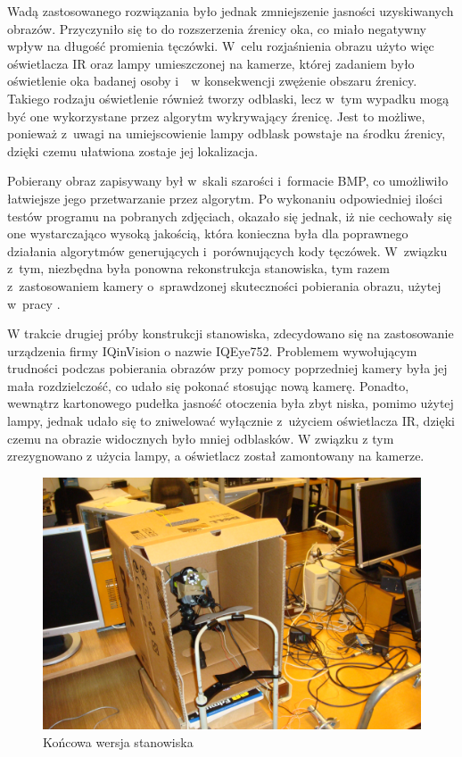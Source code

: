 Wadą zastosowanego rozwiązania było jednak zmniejszenie jasności uzyskiwanych obrazów. Przyczyniło się to do rozszerzenia źrenicy oka, co miało negatywny wpływ na długość promienia tęczówki. W~celu rozjaśnienia obrazu użyto więc oświetlacza IR oraz lampy umieszczonej na kamerze, której zadaniem było oświetlenie oka badanej osoby i~~w konsekwencji zwężenie obszaru źrenicy. Takiego rodzaju oświetlenie również tworzy odblaski, lecz w~tym wypadku mogą być one wykorzystane przez algorytm wykrywający źrenicę. Jest to możliwe, ponieważ z~uwagi na umiejscowienie lampy odblask powstaje na środku źrenicy, dzięki czemu ułatwiona zostaje jej lokalizacja.

Pobierany obraz zapisywany był w~skali szarości i~formacie BMP, co umożliwiło łatwiejsze jego przetwarzanie przez algorytm. Po wykonaniu odpowiedniej ilości testów programu na pobranych zdjęciach, okazało się jednak, iż nie cechowały się one wystarczająco wysoką jakością, która konieczna była dla poprawnego działania algorytmów generujących i~porównujących kody tęczówek. W~związku z~tym, niezbędna była ponowna rekonstrukcja stanowiska, tym razem z~zastosowaniem kamery o~sprawdzonej skuteczności pobierania obrazu, użytej w~pracy \cite{Gl11}.

W trakcie drugiej próby konstrukcji stanowiska, zdecydowano się na zastosowanie urządzenia firmy IQinVision o nazwie IQEye752. Problemem wywołującym trudności podczas pobierania obrazów przy pomocy poprzedniej kamery była jej mała rozdzielczość, co udało się pokonać stosując nową kamerę. Ponadto, wewnątrz kartonowego pudełka jasność otoczenia była zbyt niska, pomimo użytej lampy, jednak udało się to zniwelować wyłącznie z~użyciem oświetlacza IR, dzięki czemu na obrazie widocznych było mniej odblasków. W związku z tym zrezygnowano z użycia lampy, a oświetlacz został zamontowany na kamerze.

\begin{figure}[h!]
\begin{center}
\includegraphics[scale=0.1]{stanowisko1.jpg}
\caption{Końcowa wersja stanowiska}
\label{fig:stanowisko1}
\end{center}
\end{figure}

